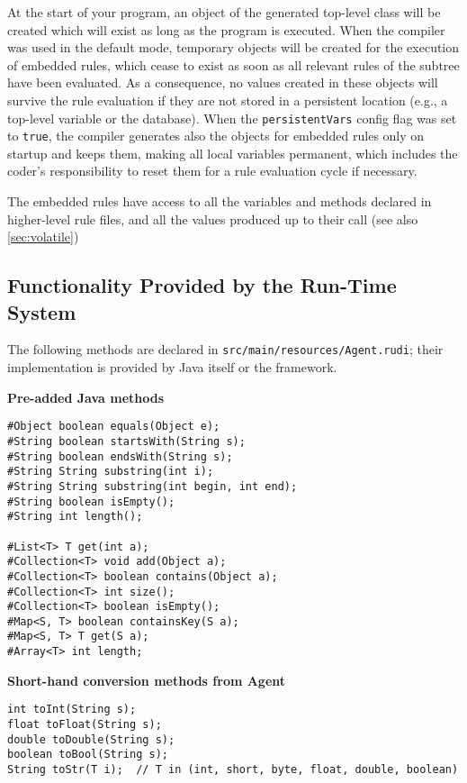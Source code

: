 At the start of your program, an object of the generated top-level class will
be created which will exist as long as the program is executed. When the
compiler was used in the default mode, temporary objects will be created for
the execution of embedded rules, which cease to exist as soon as all relevant
rules of the subtree have been evaluated. As a consequence, no values created
in these objects will survive the rule evaluation if they are not stored in a
persistent location (e.g., a top-level variable or the database). When the
\texttt{persistentVars} config flag was set to \texttt{true}, the compiler
generates also the objects for embedded rules only on startup and keeps them,
making all local variables permanent, which includes the coder's responsibility
to reset them for a rule evaluation cycle if necessary.

The embedded rules have access to all the variables and methods
declared in higher-level rule files, and all the values produced up to
their call (see also \ref{sec:volatile})

\subsection{Functionality Provided by the Run-Time System}
The following methods are declared in \texttt{src/main/resources/Agent.rudi};
their implementation is provided by Java itself or the \vonda framework.

\vspace*{2ex}

\newcommand{\pgr}[1]{\noindent\textbf{#1}}

\pgr{Pre-added Java methods}
\begin{small}
\begin{lstlisting}
#Object boolean equals(Object e);
#String boolean startsWith(String s);
#String boolean endsWith(String s);
#String String substring(int i);
#String String substring(int begin, int end);
#String boolean isEmpty();
#String int length();

#List<T> T get(int a);
#Collection<T> void add(Object a);
#Collection<T> boolean contains(Object a);
#Collection<T> int size();
#Collection<T> boolean isEmpty();
#Map<S, T> boolean containsKey(S a);
#Map<S, T> T get(S a);
#Array<T> int length;
\end{lstlisting}
\end{small}

\pgr{Short-hand conversion methods from Agent}
\begin{small}
\begin{lstlisting}
int toInt(String s);
float toFloat(String s);
double toDouble(String s);
boolean toBool(String s);
String toStr(T i);  // T in (int, short, byte, float, double, boolean)
\end{lstlisting}
\end{small}

